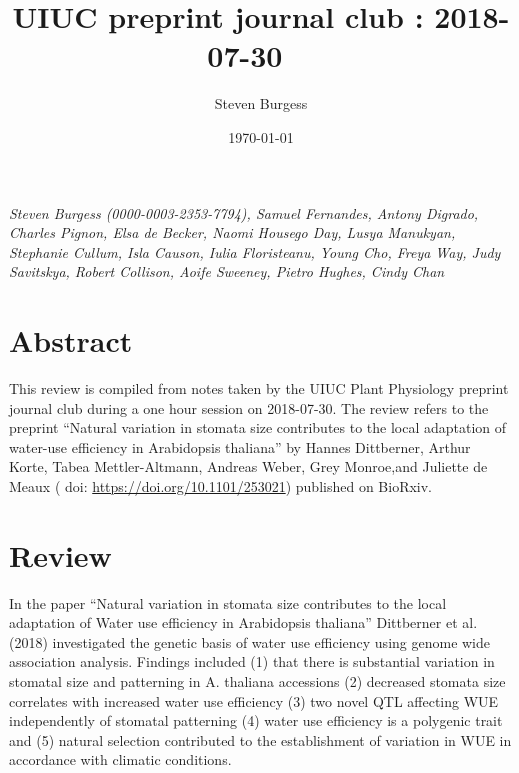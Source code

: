 \documentclass[10pt]{article}
\begin{document}
\title{UIUC preprint journal club : 2018-07-30~~}



\author[1]{Steven Burgess}%
%


\vspace{-1em}



  \date{\today}


\begingroup
\let\center\flushleft
\let\endcenter\endflushleft
\maketitle
\endgroup









\emph{Steven Burgess (0000-0003-2353-7794), Samuel Fernandes, Antony
Digrado, Charles Pignon, Elsa de Becker, Naomi Housego Day, Lusya
Manukyan, Stephanie Cullum, Isla Causon, Iulia Floristeanu, Young Cho,
Freya Way, Judy Savitskya, Robert Collison, Aoife Sweeney, Pietro
Hughes, Cindy Chan}

\section*{Abstract}

{\label{752720}}

This review is compiled from notes taken by the UIUC Plant Physiology
preprint journal club during a one hour session on 2018-07-30. The
review refers to the preprint ``Natural variation in stomata size
contributes to the local adaptation of water-use efficiency in
Arabidopsis thaliana'' by Hannes Dittberner, Arthur Korte, Tabea
Mettler-Altmann, Andreas Weber, Grey
Monroe,\href{http://orcid.org/0000-0002-2942-4750}{}and Juliette de
Meaux ( doi: \url{https://doi.org/10.1101/253021}) published on BioRxiv.

\par\null

\section*{Review}

{\label{304309}}

In the paper ``Natural variation in stomata size contributes to the
local adaptation of Water use efficiency in Arabidopsis thaliana''
Dittberner et al. (2018) investigated the genetic basis of water use
efficiency using genome wide association analysis. Findings included (1)
that there is substantial variation in stomatal size and patterning in
A. thaliana accessions (2) decreased stomata size correlates with
increased water use efficiency (3) two novel QTL affecting WUE
independently of stomatal patterning (4) water use efficiency is a
polygenic trait and (5) natural selection contributed to the
establishment of variation in WUE in accordance with climatic
conditions.
\end{document}
